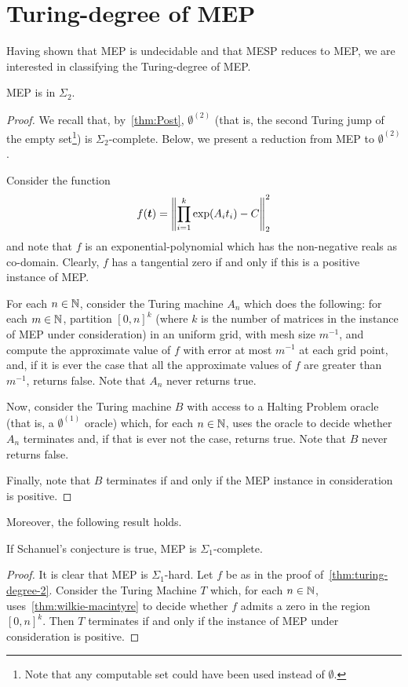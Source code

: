 \section{Turing-degree of MEP}
\label{sec:turing-degree-lics}

Having shown that MEP is undecidable and that MESP reduces to MEP, we are interested in classifying the Turing-degree of MEP.

\begin{theorem}
\label{thm:turing-degree-2}
  MEP is in $\Sigma_{2}$.
\end{theorem}

\begin{proof}
  We recall that, by~\cref{thm:Post}, $\emptyset^{(2)}$ (that is, the second Turing jump of the empty set\footnote{Note that any computable set could have been used instead of $\emptyset$.}) is $\Sigma_{2}$-complete. Below, we present a reduction from MEP to $\emptyset^{(2)}$.

  Consider the function
  \begin{equation*}
    f(\boldsymbol{t}) = \left\| \prod \limits_{i=1}^{k} \exp(A_{i} t_{i}) - C \right\|_{2}^{2}
  \end{equation*}
  and note that $f$ is an exponential-polynomial which has the non-negative reals as co-domain. Clearly, $f$ has a tangential zero if and only if this is a positive instance of MEP.

  For each $n \in \mathbb{N}$, consider the Turing machine $A_{n}$ which does the following: for each $m \in \mathbb{N}$, partition $[0,n]^{k}$ (where $k$ is the number of matrices in the instance of MEP under consideration) in an uniform grid, with mesh size $m^{-1}$, and compute the approximate value of $f$ with error at most $m^{-1}$ at each grid point, and, if it is ever the case that all the approximate values of $f$ are greater than $m^{-1}$, returns false. Note that $A_{n}$ never returns true.

  Now, consider the Turing machine $B$ with access to a Halting Problem oracle (that is, a $\emptyset^{(1)}$ oracle) which, for each $n \in \mathbb{N}$, uses the oracle to decide whether $A_{n}$ terminates and, if that is ever not the case, returns true. Note that $B$ never returns false.

  Finally, note that $B$ terminates if and only if the MEP instance in consideration is positive.
\end{proof}

Moreover, the following result holds.

\begin{theorem}
  If Schanuel's conjecture is true, MEP is $\Sigma_{1}$-complete.
\end{theorem}

\begin{proof}
  It is clear that MEP is $\Sigma_{1}$-hard.
  Let $f$ be as in the proof of~\cref{thm:turing-degree-2}. Consider the Turing Machine $T$ which, for each $n \in \mathbb{N}$, uses~\cref{thm:wilkie-macintyre} to decide whether $f$ admits a zero in the region $[0,n]^{k}$. Then $T$ terminates if and only if the instance of MEP under consideration is positive.
\end{proof}

